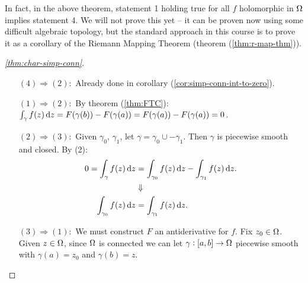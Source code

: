 \begin{remark}
In fact, in the above theorem, statement 1 holding true for all $f$ holomorphic in $\Omega$ implies statement 4. We will not prove this yet -- it can be proven now using some difficult algebraic topology, but the standard approach in this course is to prove it as a corollary of the Riemann Mapping Theorem (theorem (\ref{thm:r-map-thm})).
\end{remark}

\begin{proof}[\ref{thm:char-simp-conn}]
\begin{enumerate}
    \item[$(4)\Rightarrow (2):$] Already done in corollary (\ref{cor:simp-conn-int-to-zero}).
    \item[$(1)\Rightarrow (2):$] By theorem (\ref{thm:FTC}): $\int_\gamma f(z) \dif z = F(\gamma(b)) - F(\gamma(a)) = F(\gamma(a)) - F(\gamma(a)) = 0$.
    \item[$(2)\Rightarrow (3):$] Given $\gamma_0, \, \gamma_1$, let $\gamma = \gamma_0 \cup -\gamma_1$. Then $\gamma$ is piecewise smooth and closed. By (2):
    \begin{align*}
        0= \int_\gamma f(z) \dif z &= \int_{\gamma_0} f(z) \dif z - \int_{\gamma_1} f(z) \dif z.\\
        &\Downarrow\\
        \int_{\gamma_0} f(z) \dif z &= \int_{\gamma_1} f(z) \dif z.
    \end{align*}
    
    \item[$(3)\Rightarrow (1):$] We must construct $F$ an antiderivative for $f$. Fix $z_0 \in \Omega$. Given $z \in \Omega$, since $\Omega$ is connected we can let $\gamma: [a,b] \to \Omega$ piecewise smooth with $\gamma(a) = z_0$ and $\gamma(b) = z$.
    
\begin{center}
\end{center}
    

\end{enumerate}
\end{proof}
